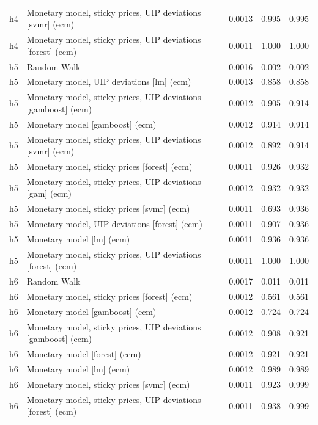 \begin{ThreePartTable}
\begin{longtable}[t]{cp{5.5cm}ccc}
h4 & \raggedright Monetary model, sticky prices, UIP deviations [svmr] (ecm) & 0.0013 & 0.995 & 0.995\\
h4 & \raggedright Monetary model, sticky prices, UIP deviations [forest] (ecm) & 0.0011 & 1.000 & 1.000\\
\addlinespace
h5 & \raggedright Random Walk & 0.0016 & 0.002 & 0.002\\
h5 & \raggedright Monetary model, UIP deviations [lm] (ecm) & 0.0013 & 0.858 & 0.858\\
h5 & \raggedright Monetary model, sticky prices, UIP deviations [gamboost] (ecm) & 0.0012 & 0.905 & 0.914\\
h5 & \raggedright Monetary model [gamboost] (ecm) & 0.0012 & 0.914 & 0.914\\
h5 & \raggedright Monetary model, sticky prices, UIP deviations [svmr] (ecm) & 0.0012 & 0.892 & 0.914\\
h5 & \raggedright Monetary model, sticky prices [forest] (ecm) & 0.0011 & 0.926 & 0.932\\
h5 & \raggedright Monetary model, sticky prices, UIP deviations [gam] (ecm) & 0.0012 & 0.932 & 0.932\\
h5 & \raggedright Monetary model, sticky prices [svmr] (ecm) & 0.0011 & 0.693 & 0.936\\
h5 & \raggedright Monetary model, UIP deviations [forest] (ecm) & 0.0011 & 0.907 & 0.936\\
h5 & \raggedright Monetary model [lm] (ecm) & 0.0011 & 0.936 & 0.936\\
h5 & \raggedright Monetary model, sticky prices, UIP deviations [forest] (ecm) & 0.0011 & 1.000 & 1.000\\
\addlinespace
h6 & \raggedright Random Walk & 0.0017 & 0.011 & 0.011\\
h6 & \raggedright Monetary model, sticky prices [forest] (ecm) & 0.0012 & 0.561 & 0.561\\
h6 & \raggedright Monetary model [gamboost] (ecm) & 0.0012 & 0.724 & 0.724\\
h6 & \raggedright Monetary model, sticky prices, UIP deviations [gamboost] (ecm) & 0.0012 & 0.908 & 0.921\\
h6 & \raggedright Monetary model [forest] (ecm) & 0.0012 & 0.921 & 0.921\\
h6 & \raggedright Monetary model [lm] (ecm) & 0.0012 & 0.989 & 0.989\\
h6 & \raggedright Monetary model, sticky prices [svmr] (ecm) & 0.0011 & 0.923 & 0.999\\
h6 & \raggedright Monetary model, sticky prices, UIP deviations [forest] (ecm) & 0.0011 & 0.938 & 0.999\\

\end{longtable}
\end{ThreePartTable}
